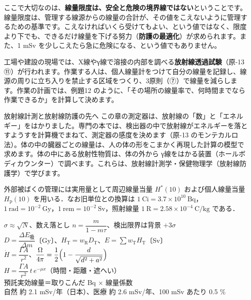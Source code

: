 ここで大切なのは、\textbf{線量限度は、安全と危険の境界線ではない}ということです。線量限度は、管理する線源からの線量の合計が、その値をこえないように管理するための基準です。こえなければいくら受けてもよい、という値ではなく、限度より下でも、できるだけ線量を下げる努力（\textbf{防護の最適化}）が求められます。また、1 mSv を少しこえたら急に危険になる、という値でもありません。

工場や建設の現場では、X線やγ線で溶接の内部を調べる\textbf{放射線透過試験}（原-13 ⑪）が行われます。作業する人は、個人線量計をつけて自分の線量を記録し、線源の周りに立ち入りを禁止する区域をつくり、3原則（⑦）で線量を減らします。作業の計画では、例題12 のように、「その場所の線量率で、何時間までなら作業できるか」を計算して決めます。

\begin{phsaki}{放射線計測と放射線防護の先へ}
この章の測定器は、放射線の「数」と「エネルギー」をはかりました。専門の本では、検出器の中で放射線がエネルギーを落とすようすを計算機でまねて、測定器の感度を決めます（原-13 のモンテカルロ法）。体の中の臓器ごとの線量は、人の体の形をこまかく再現した計算の模型で求めます。体の中にある放射性物質は、体の外から γ線をはかる装置（ホールボディカウンター）で調べます。これらは、放射線計測学・保健物理学（放射線防護学）で学びます。
\end{phsaki}

\begin{senmonsho}[放射線防護の専門書の書き方]
\begin{bkhonbun}
外部被ばくの管理には実用量として周辺線量当量 $H^*(10)$ および個人線量当量 $H_{\mathrm p}(10)$ を用いる．なお旧単位との換算は $1\ \mathrm{Ci}=3.7\times10^{10}\ \mathrm{Bq}$，$1\ \mathrm{rad}=10^{-2}\ \mathrm{Gy}$，$1\ \mathrm{rem}=10^{-2}\ \mathrm{Sv}$，照射線量 $1\ \mathrm R=2.58\times10^{-4}\ \mathrm{C/kg}$ である．
\end{bkhonbun}
\end{senmonsho}

\begin{taisetsu}
\def\tsl#1{\makebox[7.6\zw][l]{\sffamily\bfseries\small\color{\bkTT}#1}}
\tsl{数える}$\sigma\approx\sqrt N$、数え落とし $n=\dfrac{m}{1-m\tau}$、検出限界は背景 $+3\sigma$\\[3pt]
\tsl{線量}$D=\dfrac{\Delta E_{\text{吸}}}{\Delta m}$〔Gy〕、$H_{\mathrm T}=w_{\mathrm R}D_{\mathrm T}$、$E=\textstyle\sum w_{\mathrm T}H_{\mathrm T}$〔Sv〕\\[3pt]
\tsl{点線源}$\dot H=\dfrac{\Gamma A}{r^2}$、$\dfrac{\Omega}{4\pi}=\dfrac12\Bigl(1-\dfrac{d}{\sqrt{d^2+a^2}}\Bigr)$\\[3pt]
\tsl{3原則}$H=\dfrac{\Gamma A}{r^2}\,t\,e^{-\mu x}$（時間・距離・遮へい）\\[3pt]
\tsl{内部被ばく}預託実効線量＝取りこんだ Bq × 線量係数\\[3pt]
\tsl{量で比べる}自然 約 2.1 mSv/年（日本）、医療 約 2.6 mSv/年、100 mSv あたり 0.5 \%
\end{taisetsu}

